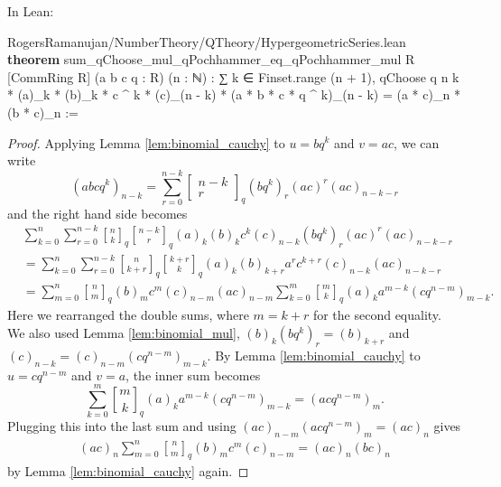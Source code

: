 \documentclass[12pt]{amsart}
\theoremstyle{definition}
\theoremstyle{remark}
\numberwithin{equation}{subsection}
\newcommand{\qbin}[2]{\genfrac{[}{]}{0pt}{}{#1}{#2}_{q}}
\newcommand{\kw}[1]{\textcolor{keywordcolor}{\textbf{#1}}}
\newcommand{\var}[1]{\textcolor{tacticcolor}{#1}}
\newcommand{\num}[1]{\textcolor{numcolor}{#1}}
\newcommand{\imp}[1]{\textcolor{commentcolor}{\textbraceleft#1\textbraceright}}
\begin{document}
In Lean:

\begin{code}{RogersRamanujan/NumberTheory/QTheory/HypergeometricSeries.lean}
\kw{theorem} sum_qChoose_mul_qPochhammer_eq_qPochhammer_mul \imp{R} [CommRing \var{R}] (\var{a} \var{b} \var{c} \var{q} : \var{R}) (\var{n} : ℕ) :
  ∑ \var{k} ∈ Finset.range (\var{n} + \num{1}),
    qChoose \var{q} \var{n} \var{k} * (\var{a})_\var{k} * (\var{b})_\var{k} * \var{c} ^ \var{k} * (\var{c})_(\var{n} - \var{k}) * (\var{a} * \var{b} * \var{c} * \var{q} ^ \var{k})_(\var{n} - \var{k}) =
  (\var{a} * \var{c})_\var{n} * (\var{b} * \var{c})_\var{n} :=
\end{code}

\begin{proof}
    Applying Lemma \ref{lem:binomial_cauchy} to $u = bq^k$ and $v = ac$, we can write
    \begin{equation}
        \label{eqn:qPS-lemma}
        (abcq^k)_{n-k} = \sum_{r=0}^{n-k} \begin{bmatrix}
            n-k \\ r
        \end{bmatrix}_q (bq^k)_r (ac)^r (ac)_{n-k-r}
    \end{equation}
    and the right hand side becomes
    \begin{align*}
        &\sum_{k=0}^{n} \sum_{r=0}^{n-k} \qbin{n}{k} \qbin{n-k}{r} (a)_k (b)_k c^k (c)_{n-k} (bq^k)_r (ac)^r (ac)_{n-k-r}\\
        &=\sum_{k=0}^{n} \sum_{r=0}^{n-k} \qbin{n}{k+r}\qbin{k+r}{k} (a)_k (b)_{k+r} a^r c^{k+r} (c)_{n-k} (ac)_{n-k-r} \\
        &= \sum_{m=0}^{n} \qbin{n}{m} (b)_m c^m (c)_{n-m} (ac)_{n-m} \sum_{k=0}^{m} \qbin{m}{k} (a)_k a^{m-k} (cq^{n-m})_{m-k}.
    \end{align*}
    Here we rearranged the double sums, where $m = k + r$ for the second equality.
    We also used Lemma \eqref{lem:binomial_mul}, $(b)_k (bq^k)_r = (b)_{k+r}$ and $(c)_{n-k} = (c)_{n-m} (cq^{n-m})_{m-k}$.
    By Lemma \ref{lem:binomial_cauchy} to $u = cq^{n-m}$ and $v = a$, the inner sum becomes
    $$
        \sum_{k=0}^{m} \qbin{m}{k} (a)_k a^{m-k} (cq^{n-m})_{m-k} = (acq^{n-m})_m.
    $$
    Plugging this into the last sum and using $(ac)_{n-m}(acq^{n-m})_m = (ac)_n$ gives
    \begin{align*}
        (ac)_n \sum_{m=0}^{n} \qbin{n}{m} (b)_m c^m (c)_{n-m} = (ac)_n (bc)_n
    \end{align*}
    by Lemma \ref{lem:binomial_cauchy} again.
\end{proof}
\end{document}

